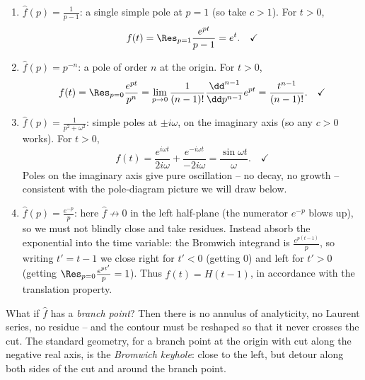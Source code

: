 \begin{example}
	\begin{enumerate}[label=(\roman*)]
		\item $\hat f(p) = \frac{1}{p - 1}$: a single simple pole at $p = 1$ (so take $c > 1$). For $t > 0$,
		$$
		f(t) = \Res_{p = 1} \frac{e^{pt}}{p - 1} = e^t. \quad\checkmark
		$$
		\item $\hat f(p) = p^{-n}$: a pole of order $n$ at the origin. For $t > 0$,
		$$
		f(t) = \Res_{p = 0} \frac{e^{pt}}{p^n} = \lim_{p \to 0}\frac{1}{(n-1)!} \frac{\dd^{n-1}}{\dd p^{n-1}} e^{pt} = \frac{t^{n - 1}}{(n-1)!}. \quad\checkmark
		$$
		\item $\hat f(p) = \frac{1}{p^2 + \omega^2}$: simple poles at $\pm i\omega$, on the imaginary axis (so any $c > 0$ works). For $t > 0$,
		$$
		f(t) = \frac{e^{i\omega t}}{2i\omega} + \frac{e^{-i\omega t}}{-2i\omega} = \frac{\sin \omega t}{\omega}. \quad\checkmark
		$$
		Poles on the imaginary axis give pure oscillation -- no decay, no growth -- consistent with the pole-diagram picture we will draw below.
		\item $\hat f(p) = \frac{e^{-p}}{p}$: here $\hat f \not\to 0$ in the left half-plane (the numerator $e^{-p}$ blows up), so we must not blindly close and take residues. Instead absorb the exponential into the time variable: the Bromwich integrand is $\frac{e^{p(t - 1)}}{p}$, so writing $t' = t - 1$ we close right for $t' < 0$ (getting $0$) and left for $t' > 0$ (getting $\Res_{p=0} \frac{e^{pt'}}{p} = 1$). Thus $f(t) = H(t - 1)$, in accordance with the translation property.
	\end{enumerate}
\end{example}

What if $\hat f$ has a \emph{branch point}? Then there is no annulus of analyticity, no Laurent series, no residue -- and the contour must be reshaped so that it never crosses the cut. The standard geometry, for a branch point at the origin with cut along the negative real axis, is the \emph{Bromwich keyhole}: close to the left, but detour along both sides of the cut and around the branch point.

\begin{center}
\end{center}

